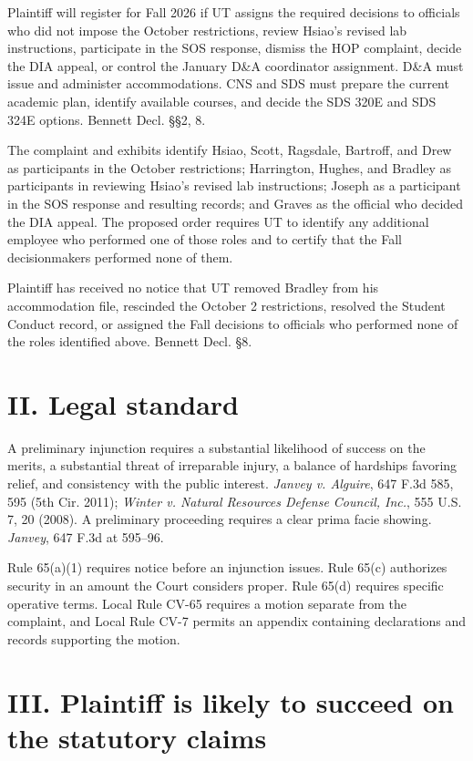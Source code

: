 \documentclass[12pt]{article}
\begin{document}
Plaintiff will register for Fall 2026 if UT assigns the required decisions to officials who did not impose the October restrictions, review Hsiao's revised lab instructions, participate in the SOS response, dismiss the HOP complaint, decide the DIA appeal, or control the January D\&A coordinator assignment. D\&A must issue and administer accommodations. CNS and SDS must prepare the current academic plan, identify available courses, and decide the SDS 320E and SDS 324E options. Bennett Decl. \S\S 2, 8.
 
The complaint and exhibits identify Hsiao, Scott, Ragsdale, Bartroff, and Drew as participants in the October restrictions; Harrington, Hughes, and Bradley as participants in reviewing Hsiao's revised lab instructions; Joseph as a participant in the SOS response and resulting records; and Graves as the official who decided the DIA appeal. The proposed order requires UT to identify any additional employee who performed one of those roles and to certify that the Fall decisionmakers performed none of them.
 
Plaintiff has received no notice that UT removed Bradley from his accommodation file, rescinded the October 2 restrictions, resolved the Student Conduct record, or assigned the Fall decisions to officials who performed none of the roles identified above. Bennett Decl. \S 8.
 
\section*{II. Legal standard}
 
A preliminary injunction requires a substantial likelihood of success on the merits, a substantial threat of irreparable injury, a balance of hardships favoring relief, and consistency with the public interest. \textit{Janvey v. Alguire}, 647 F.3d 585, 595 (5th Cir. 2011); \textit{Winter v. Natural Resources Defense Council, Inc.}, 555 U.S. 7, 20 (2008). A preliminary proceeding requires a clear prima facie showing. \textit{Janvey}, 647 F.3d at 595--96.
 
Rule 65(a)(1) requires notice before an injunction issues. Rule 65(c) authorizes security in an amount the Court considers proper. Rule 65(d) requires specific operative terms. Local Rule CV-65 requires a motion separate from the complaint, and Local Rule CV-7 permits an appendix containing declarations and records supporting the motion.
 
\section*{III. Plaintiff is likely to succeed on the statutory claims}
 
\end{document}
